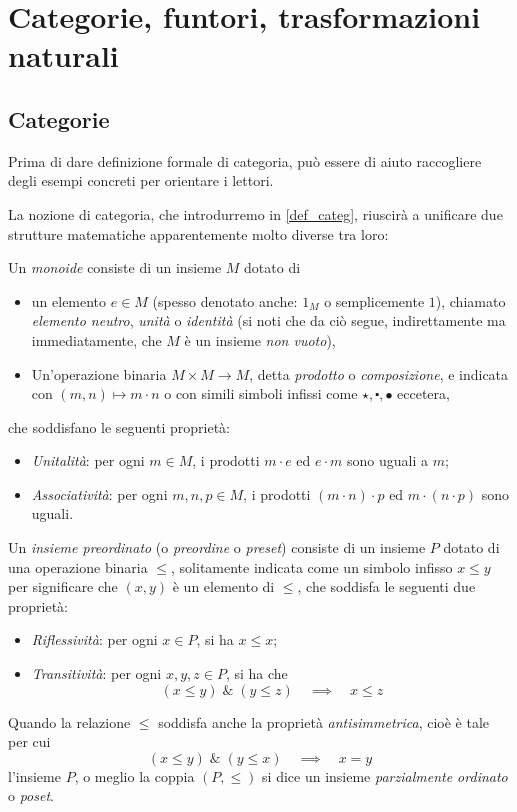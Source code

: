\chapter{Categorie, funtori, trasformazioni naturali}

\section{Categorie}\label{categorie}

Prima di dare definizione formale di categoria, può essere di aiuto raccogliere degli esempi concreti per orientare i lettori.

La nozione di categoria, che introdurremo in \ref{def_categ}, riuscirà a unificare due strutture matematiche apparentemente molto diverse tra loro:
\begin{definition}
	Un \emph{monoide} consiste di un insieme \(M\) dotato di
	\begin{itemize}
		\item un elemento \(e\in M\) (spesso denotato anche: $1_M$ o semplicemente $1$), chiamato \emph{elemento neutro}, \emph{unità} o \emph{identità} (si noti che da ciò segue, indirettamente ma immediatamente, che \(M\) è un insieme \emph{non vuoto}),
		\item Un'operazione binaria \(M\times M\to M\), detta \emph{prodotto} o \emph{composizione}, e indicata con \((m,n)\mapsto m\cdot n\) o con simili simboli infissi come $\star, \centerdot,\bullet$ eccetera,
	\end{itemize}
	che soddisfano le seguenti proprietà:
	\begin{itemize}
		\item \emph{Unitalità}: per ogni \(m\in M\), i prodotti \(m \cdot e\) ed \(e\cdot m\) sono uguali a \(m\);
		\item \emph{Associatività}: per ogni \(m,n,p\in M\), i prodotti \((m\cdot n)\cdot p\) ed \(m\cdot (n\cdot p)\) sono uguali.
	\end{itemize}
\end{definition}
\begin{definition}
	Un \emph{insieme preordinato} (o \emph{preordine} o \emph{preset}) consiste di un insieme \(P\) dotato di una operazione binaria \(\le\), solitamente indicata come un simbolo infisso \(x\le y\) per significare che \((x,y)\) è un elemento di \(\le\), che soddisfa le seguenti due proprietà:
	\begin{itemize}
		\item \emph{Riflessività}: per ogni $x\in P$, si ha $x\le x$;
		\item \emph{Transitività}: per ogni $x,y,z\in P$, si ha che
		\[(x\le y)\;\&\;(y\le z) \quad\implies\quad x\le z\]
	\end{itemize}
	Quando la relazione \(\le\) soddisfa anche la proprietà \emph{antisimmetrica}, cioè è tale per cui
		\[(x\le y)\;\&\;(y\le x) \quad\implies\quad x = y\]
	l'insieme \(P\), o meglio la coppia \((P,\le)\) si dice un insieme \emph{parzialmente ordinato} o \emph{poset}.
\end{definition}
